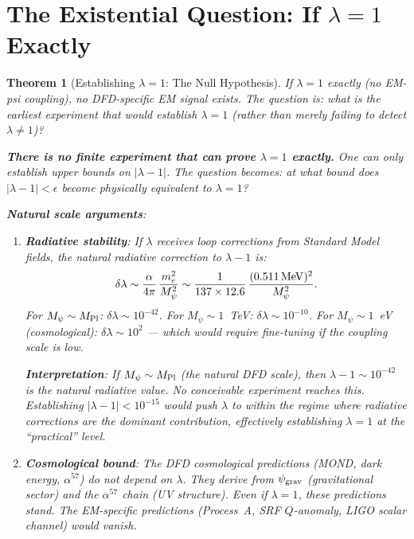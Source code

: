 \documentclass[11pt]{article}
\newcommand{\lam}{\lambda}
\newcommand{\lbone}{|\lam - 1|}
\newcommand{\psigrav}{\psi_{\rm grav}}
\newtheorem{theorem}{Theorem}[section]
\theoremstyle{definition}
\theoremstyle{remark}
\begin{document}
\begin{tcolorbox}[colback=blue!3!white, colframe=blue!50!black,
  title=\textbf{DFD EXPERIMENTAL DECISION TREE},
  breakable]
\end{tcolorbox}


\section{The Existential Question: If $\lambda = 1$ Exactly}
\label{sec:lambda_exact}

\begin{theorem}[Establishing $\lambda = 1$: The Null Hypothesis]
\label{thm:lambda_exact}
If $\lambda = 1$ exactly (no EM-psi coupling), no DFD-specific EM signal
exists. The question is: what is the earliest experiment that would
\emph{establish} $\lambda = 1$ (rather than merely failing to detect
$\lambda \neq 1$)?

\textbf{There is no finite experiment that can prove $\lambda = 1$
exactly.} One can only establish upper bounds on $\lbone$. The
question becomes: at what bound does $\lbone < \epsilon$ become
\emph{physically equivalent} to $\lambda = 1$?

\textbf{Natural scale arguments}:
\begin{enumerate}
\item \textbf{Radiative stability}: If $\lambda$ receives loop
  corrections from Standard Model fields, the natural radiative
  correction to $\lambda - 1$ is:
  \begin{equation}
  \delta\lambda \sim \frac{\alpha}{4\pi}\,
  \frac{m_e^2}{M_\psi^2} \sim \frac{1}{137\times 12.6}\,
  \frac{(0.511\,{\rm MeV})^2}{M_\psi^2}.
  \end{equation}
  For $M_\psi \sim M_{\rm Pl}$: $\delta\lambda \sim 10^{-42}$.
  For $M_\psi \sim 1$~TeV: $\delta\lambda \sim 10^{-10}$.
  For $M_\psi \sim 1$~eV (cosmological): $\delta\lambda \sim 10^{2}$
  --- which would require fine-tuning if the coupling scale is low.

  \textbf{Interpretation}: If $M_\psi \sim M_{\rm Pl}$ (the natural
  DFD scale), then $\lambda - 1 \sim 10^{-42}$ is the natural radiative
  value. No conceivable experiment reaches this. Establishing
  $\lbone < 10^{-15}$ would push $\lambda$ to within the regime where
  radiative corrections are the dominant contribution, effectively
  establishing $\lambda = 1$ at the ``practical'' level.

\item \textbf{Cosmological bound}: The DFD cosmological predictions
  (MOND, dark energy, $\alpha^{57}$) do not depend on $\lambda$.
  They derive from $\psigrav$ (gravitational sector) and the
  $\alpha^{57}$ chain (UV structure). Even if $\lambda = 1$, these
  predictions stand. The EM-specific predictions (Process~A, SRF
  $Q$-anomaly, LIGO scalar channel) would vanish.


\end{enumerate}
\end{theorem}
\end{document}
